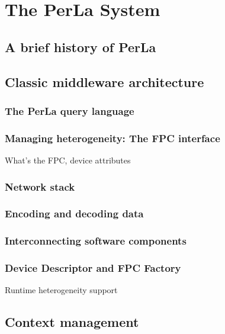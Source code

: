 \chapter{The PerLa System}

\section{A brief history of PerLa}

\section{Classic middleware architecture}

\subsection{The PerLa query language}

\subsection{Managing heterogeneity: The FPC interface}

What's the FPC, device attributes

\subsection{Network stack}

\subsection{Encoding and decoding data}

\subsection{Interconnecting software components}

\subsection{Device Descriptor and FPC Factory}

Runtime heterogeneity support

\section{Context management}

